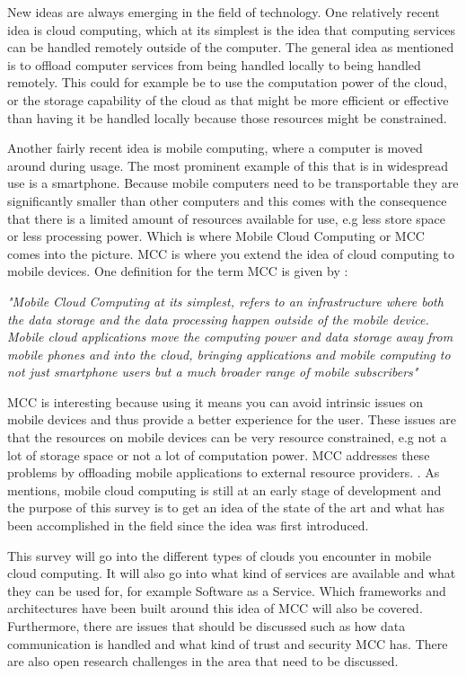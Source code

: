 
New ideas are always emerging in the field of technology.
One relatively recent idea is cloud computing, which at its simplest is the idea that computing services can be handled remotely outside of the computer. 
The general idea as mentioned is to offload computer services from being handled locally to being handled remotely. 
This could for example be to use the computation power of the cloud, or the storage capability of the cloud as that might be more efficient or effective than having it be handled locally because those resources might be constrained.

Another fairly recent idea is mobile computing, where a computer is moved around during usage.
The most prominent example of this that is in widespread use is a smartphone.
Because mobile computers need to be transportable they are significantly smaller than other computers and this comes with the consequence that there is a limited amount of resources available for use, e.g less store space or less processing power.
Which is where Mobile Cloud Computing or MCC comes into the picture. 
MCC is where you extend the idea of cloud computing to mobile devices.
One definition for the term MCC is given by \citet{article:mobilecloudreviewinderkildesecurity}:

\textit{"Mobile Cloud Computing at its simplest, refers to an infrastructure where both the data storage and the data processing happen outside of the mobile device. Mobile cloud applications move the computing power and data storage away from mobile phones and into the cloud, bringing applications and mobile computing to not just smartphone users but a much broader range of mobile subscribers"}

MCC is interesting because using it means you can avoid intrinsic issues on mobile devices and thus provide a better experience for the user. 
These issues are that the resources on mobile devices can be very resource constrained, e.g not a lot of storage space or not a lot of computation power.
MCC addresses these problems by offloading mobile applications to external resource providers. \citet{fernando2013mobile}.
As \citet{6215350} mentions, mobile cloud computing is still at an early stage of development and the purpose of this survey is to get an idea of the state of the art and what has been accomplished in the field since the idea was first introduced. 

This survey will go into the different types of clouds you encounter in mobile cloud computing.
It will also go into what kind of services are available and what they can be used for, for example Software as a Service.
Which frameworks and architectures have been built around this idea of MCC will also be covered. 
Furthermore, there are issues that should be discussed such as how data communication is handled and what kind of trust and security MCC has. 
There are also open research challenges in the area that need to be discussed. 